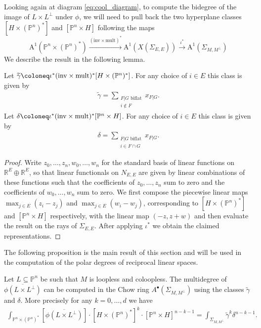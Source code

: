 \documentclass[12pt,a4paper,english]{scrartcl}
\newcommand{\RR}{\mathbb{R}}
\newcommand{\PP}{\mathbb{P}}
\newcommand{\ChowGrp}{\mathrm{A}}
\begin{document}
Looking again at diagram \eqref{eq:cool_diagram}, to compute the bidegree of the image of $L\times L^\perp$ under $\phi$, we will need to pull back the two hyperplane classes $[H \times (\PP^n)^*]$ and $[\PP^n\times H]$ following the maps
\[
\ChowGrp^1(\PP^n\times (\PP^n)^*) \overset{(\text{inv} \times \text{mult})^*}{\longrightarrow} \ChowGrp^1(X(\Sigma_{E,E})) \overset{\iota^*}{\longrightarrow} \ChowGrp^1(\Sigma_{M,M^\perp})
\]
We describe the result  in the following lemma.
\begin{lemma}
\label{lem:gammadelta}
     Let $\widetilde{\gamma}\coloneq \iota^*(\textup{inv}\times \textup{mult})^*[H \times (\PP^n)^*]$. For any choice of $i\in E$ this class is given by \begin{align*}
\widetilde{\gamma}=\sum_{\substack{F|G \text{ biflat} \\ i \notin F}}x_{F|G}.
    \end{align*}
    Let $\delta\coloneq\iota^*(\textup{inv}\times \textup{mult})^*[\PP^n\times H]$. For any choice of $i\in E$ this class is given by 
    \begin{align*}
\delta=\sum_{\substack{F|G \text{ biflat} \\ i \in F\cap G}}x_{F|G}.
    \end{align*}
\end{lemma}
\begin{proof}
    Write $z_0,\ldots,z_n,w_0,\ldots,w_n$  for the standard basis of linear functions on $\RR^E\oplus \RR^E$, so that linear functionals on $N_{E,E}$ are given by linear combinations of these functions such that the coefficients of $z_0,\ldots,z_n$ sum to zero and the coefficients of $w_0,\ldots,w_n$ sum to zero.
    We first compose the piecewise linear maps $\max_{j\in E}(z_i-z_j)$ and $\max_{j\in E}(w_i-w_j)$, corresponding to $[H\times (\PP^n)^*]$ and $[\PP^n \times H]$ respectively, with the linear map $(-z,z+w)$ and then evaluate the result on the rays of $\Sigma_{E,E}$. After applying $\iota^*$ we obtain the claimed representations.
\end{proof}

The following proposition is the main result of this section and will be used in the computation of the polar degrees of reciprocal linear spaces.
\begin{proposition}\label{prop:howtocomputedegrees}
    Let $L\subseteq \PP^n$ be such that $M$ is loopless and coloopless. The multidegree of $\overline{\phi(L\times L^\perp)}$ can be computed in the Chow ring $A^\bullet(\Sigma_{M,M^\perp})$ using the classes $\widetilde{\gamma}$ and $\delta$. More precisely for any $k=0,\ldots, d$ we have \begin{align*}
        \int_{\PP^n \times (\PP^n)^*}[\overline{\phi(L\times L^\perp)}]\cdot[H\times (\PP^n)^*]^k\cdot[\PP^n\times H]^{n-k-1}=\int_{\Sigma_{M,M^\perp}}\widetilde{\gamma}^k\delta^{n-k-1}.
    \end{align*}
\end{proposition}
\end{document}
